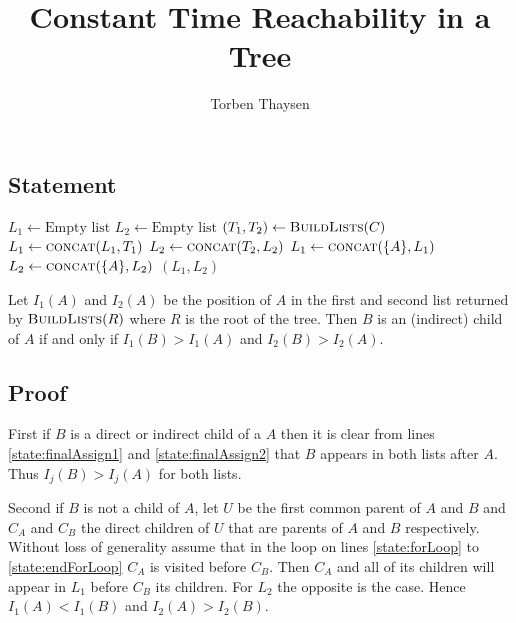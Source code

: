 \documentclass[a4paper, 12pt]{article}
\author{Torben Thaysen}
\title{Constant Time Reachability in a Tree}
\begin{document}
\maketitle

\subsection*{Statement}
\begin{algorithmic}[1]
\State $L_1 \gets \text{Empty list}$
\State $L_2 \gets \text{Empty list}$
 \label{state:forLoop}
	\State $(T_1, T_2) \gets \Call{BuildLists}{C}$
	\State $L_1 \gets \Call{concat}{L_1, T_1}$
	\State $L_2 \gets \Call{concat}{T_2, L_2}$
\EndFor \label{state:endForLoop}
\State $L_1 \gets \Call{concat}{\{A\}, L_1}$ \label{state:finalAssign1}
\State $L_2 \gets \Call{concat}{\{A\}, L_2}$ \label{state:finalAssign2}
\State \Return $(L_1, L_2)$
\EndFunction
\end{algorithmic}
Let $I_1(A)$ and $I_2(A)$ be the position of $A$ in the first and second list returned by $\Call{BuildLists}{R}$ where $R$ is the root of the tree. Then $B$ is an (indirect) child of $A$ if and only if $I_1(B) > I_1(A)$ and $I_2(B) > I_2(A)$.

\subsection*{Proof}
First if $B$ is a direct or indirect child of a $A$ then it is clear from lines \ref{state:finalAssign1} and \ref{state:finalAssign2} that $B$ appears in both lists after $A$. Thus $I_j(B) > I_j(A)$ for both lists.
\par\noindent
Second if $B$ is not a child of $A$, let $U$ be the first common parent of $A$ and $B$ and $C_A$ and $C_B$ the direct children of $U$ that are parents of $A$ and $B$ respectively. Without loss of generality assume that in the loop on lines \ref{state:forLoop} to \ref{state:endForLoop} $C_A$ is visited before $C_B$. Then $C_A$ and all of its children will appear in $L_1$ before $C_B$ its children. For $L_2$ the opposite is the case. Hence $I_1(A) < I_1(B)$ and $I_2(A) > I_2(B)$.
\end{document}
